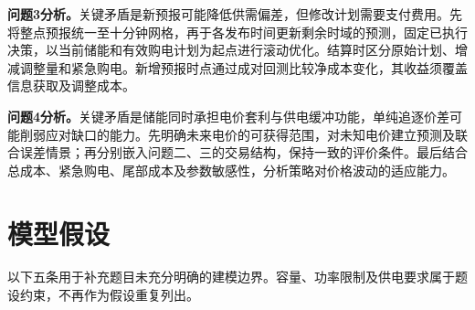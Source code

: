 \documentclass[UTF8,a4paper,12pt,fontset=fandol]{ctexart}
\numberwithin{equation}{section}
\begin{document}
\textbf{问题3分析。}关键矛盾是新预报可能降低供需偏差，但修改计划需要支付费用。先将整点预报统一至十分钟网格，再于各发布时间更新剩余时域的预测，固定已执行决策，以当前储能和有效购电计划为起点进行滚动优化。结算时区分原始计划、增减调整量和紧急购电。新增预报时点通过成对回测比较净成本变化，其收益须覆盖信息获取及调整成本。

\textbf{问题4分析。}关键矛盾是储能同时承担电价套利与供电缓冲功能，单纯追逐价差可能削弱应对缺口的能力。先明确未来电价的可获得范围，对未知电价建立预测及联合误差情景；再分别嵌入问题二、三的交易结构，保持一致的评价条件。最后结合总成本、紧急购电、尾部成本及参数敏感性，分析策略对价格波动的适应能力。

\par
\endgroup
\clearpage

\section{模型假设}
\label{sec:assumptions}

以下五条用于补充题目未充分明确的建模边界。容量、功率限制及供电要求属于题设约束，不再作为假设重复列出。
\end{document}
